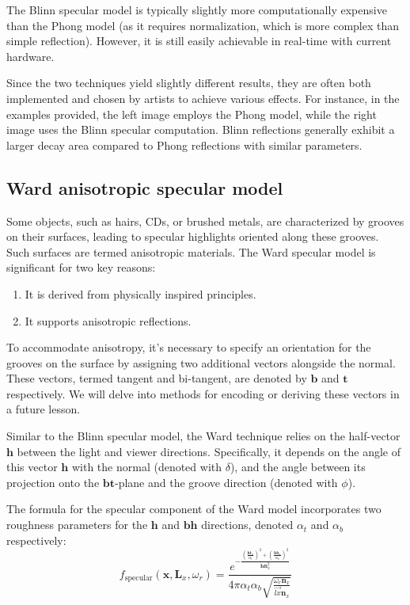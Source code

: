 The Blinn specular model is typically slightly more computationally expensive than the Phong model (as it requires normalization, which is more complex than simple reflection). However, it is still easily achievable in real-time with current hardware.

Since the two techniques yield slightly different results, they are often both implemented and chosen by artists to achieve various effects. 
For instance, in the examples provided, the left image employs the Phong model, while the right image uses the Blinn specular computation. 
Blinn reflections generally exhibit a larger decay area compared to Phong reflections with similar parameters.

\subsection{Ward anisotropic specular model}
Some objects, such as hairs, CDs, or brushed metals, are characterized by grooves on their surfaces, leading to specular highlights oriented along these grooves. 
Such surfaces are termed anisotropic materials. The Ward specular model is significant for two key reasons:
\begin{enumerate}
    \item It is derived from physically inspired principles.
    \item It supports anisotropic reflections.
\end{enumerate}
To accommodate anisotropy, it's necessary to specify an orientation for the grooves on the surface by assigning two additional vectors alongside the normal. 
These vectors, termed tangent and bi-tangent, are denoted by $\mathbf{b}$ and $\mathbf{t}$ respectively. 
We will delve into methods for encoding or deriving these vectors in a future lesson.

Similar to the Blinn specular model, the Ward technique relies on the half-vector $\mathbf{h}$ between the light and viewer directions.
Specifically, it depends on the angle of this vector $\mathbf{h}$  with the normal (denoted with $\delta$), and the angle between its projection onto the $\mathbf{bt}$-plane and the groove direction (denoted with $\phi$).

The formula for the specular component of the Ward model incorporates two roughness parameters for the $\mathbf{h}$ and $\mathbf{bh}$ directions, denoted $\alpha_t$ and $\alpha_b$ respectively:
\[f_{\text{specular}}(\mathbf{x}, \mathbf{L}_x, \omega_r) =\dfrac{e^{-\frac{\left(\frac{\mathbf{ht}_x}{\alpha_t}\right)^2+\left(\frac{\mathbf{hb}_x}{\alpha_b}\right)^2}{\mathbf{hn}_x^2}}}{4\pi\alpha_t\alpha_b\sqrt{\frac{\omega_r\mathbf{n}_x}{\overrightarrow{lx}\mathbf{n}_x}}}\]

